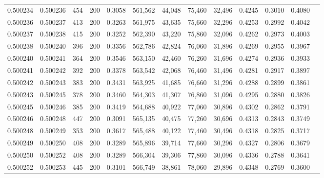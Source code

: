 \begin{tabular}{rrrrrrrrrrrrr}
0.500234 & 0.500236 &    454 & 200 &                                     0.3058 & 561,562 &  44,048 &  75,460 &  32,496 & 0.4245 & 0.3010 & 0.4080 \\
0.500236 & 0.500237 &    413 & 200 &                                     0.3263 & 561,975 &  43,635 &  75,660 &  32,296 & 0.4253 & 0.2992 & 0.4042 \\
0.500237 & 0.500238 &    415 & 200 &                                     0.3252 & 562,390 &  43,220 &  75,860 &  32,096 & 0.4262 & 0.2973 & 0.4003 \\
0.500238 & 0.500240 &    396 & 200 &                                     0.3356 & 562,786 &  42,824 &  76,060 &  31,896 & 0.4269 & 0.2955 & 0.3967 \\
0.500240 & 0.500241 &    364 & 200 &                                     0.3546 & 563,150 &  42,460 &  76,260 &  31,696 & 0.4274 & 0.2936 & 0.3933 \\
0.500241 & 0.500242 &    392 & 200 &                                     0.3378 & 563,542 &  42,068 &  76,460 &  31,496 & 0.4281 & 0.2917 & 0.3897 \\
0.500242 & 0.500243 &    383 & 200 &                                     0.3431 & 563,925 &  41,685 &  76,660 &  31,296 & 0.4288 & 0.2899 & 0.3861 \\
0.500243 & 0.500245 &    378 & 200 &                                     0.3460 & 564,303 &  41,307 &  76,860 &  31,096 & 0.4295 & 0.2880 & 0.3826 \\
0.500245 & 0.500246 &    385 & 200 &                                     0.3419 & 564,688 &  40,922 &  77,060 &  30,896 & 0.4302 & 0.2862 & 0.3791 \\
0.500246 & 0.500248 &    447 & 200 &                                     0.3091 & 565,135 &  40,475 &  77,260 &  30,696 & 0.4313 & 0.2843 & 0.3749 \\
0.500248 & 0.500249 &    353 & 200 &                                     0.3617 & 565,488 &  40,122 &  77,460 &  30,496 & 0.4318 & 0.2825 & 0.3717 \\
0.500249 & 0.500250 &    408 & 200 &                                     0.3289 & 565,896 &  39,714 &  77,660 &  30,296 & 0.4327 & 0.2806 & 0.3679 \\
0.500250 & 0.500252 &    408 & 200 &                                     0.3289 & 566,304 &  39,306 &  77,860 &  30,096 & 0.4336 & 0.2788 & 0.3641 \\
0.500252 & 0.500253 &    445 & 200 &                                     0.3101 & 566,749 &  38,861 &  78,060 &  29,896 & 0.4348 & 0.2769 & 0.3600 \\

\end{tabular}
